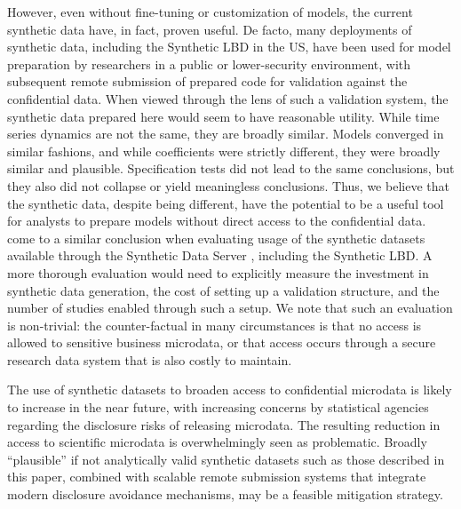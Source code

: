However, even without  fine-tuning or customization of models, the current synthetic data have, in fact, proven useful. De facto, many deployments of synthetic data, including the Synthetic LBD in the US, have been used for model preparation by researchers in a public or lower-security environment, with subsequent remote submission of prepared code for validation against the confidential data. When viewed through the lens of such a validation system, the synthetic data prepared here would seem to have reasonable utility. While time series dynamics are not the same, they are broadly similar. Models converged in similar fashions, and while coefficients were strictly different, they were broadly similar and plausible. Specification tests did not lead to the same conclusions, but they also did not collapse or yield meaningless conclusions. Thus, we believe that the synthetic data, despite being different, have the potential to be a useful tool for analysts to prepare models without direct access to the confidential data. \textcite{VilhuberAbowd2016-SOLE,Vilhuber2019-SGP} come to a similar conclusion when evaluating usage of the synthetic datasets available through the Synthetic Data Server \citep{AbowdVilhuber2010}, including the Synthetic LBD. A more thorough evaluation would need to explicitly measure the investment in synthetic data generation, the cost of setting up a validation structure, and the number of studies enabled through such a setup. We note that such an evaluation is non-trivial: the counter-factual in many circumstances is that no access is allowed to sensitive business microdata, or that access occurs through a secure research data system that is also costly to maintain.
 
The use of synthetic datasets to broaden access to confidential microdata is likely to increase in the near future, with increasing concerns by statistical agencies regarding the disclosure risks of releasing microdata. The resulting reduction in access to scientific microdata is overwhelmingly seen as problematic. Broadly ``plausible'' if not analytically valid synthetic datasets such as those described in this paper, combined with scalable remote submission systems that integrate modern disclosure avoidance mechanisms, may be a feasible mitigation strategy. 
 




